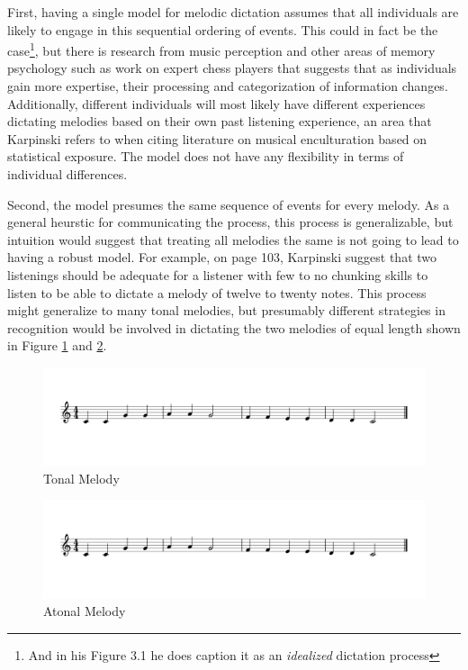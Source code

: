 \documentclass[]{book}
\let\rmarkdownfootnote\footnote%
\def\footnote{\protect\rmarkdownfootnote}
\begin{document}
First, having a single model for melodic dictation assumes that all individuals are likely to engage in this sequential ordering of events.
This could in fact be the case\footnote{And in his Figure 3.1 he does caption it as an \emph{idealized} dictation process}, but there is research from music perception \citep{goldmanImprovisationExperiencePredicts2018a} and other areas of memory psychology such as work on expert chess players \citep{laneChessKnowledgePredicts2018} that suggests that as individuals gain more expertise, their processing and categorization of information changes.
Additionally, different individuals will most likely have different experiences dictating melodies based on their own past listening experience, an area that Karpinski refers to when citing literature on musical enculturation based on statistical exposure.
The model does not have any flexibility in terms of individual differences.

Second, the model presumes the same sequence of events for every melody.
As a general heurstic for communicating the process, this process is generalizable, but intuition would suggest that treating all melodies the same is not going to lead to having a robust model.
For example, on page 103, Karpinski suggest that two listenings should be adequate for a listener with few to no chunking skills to listen to be able to dictate a melody of twelve to twenty notes.
This process might generalize to many tonal melodies, but presumably different strategies in recognition would be involved in dictating the two melodies of equal length shown in Figure \ref{fig:shortmelody1} and \ref{fig:shortmelody2}.

\begin{figure}

{\centering \includegraphics[width=0.8\linewidth]{img/musicalexamples/MMD_Figure2-1} 

}

\caption{Tonal Melody}\label{fig:shortmelody1}
\end{figure}

\begin{figure}

{\centering \includegraphics[width=0.8\linewidth]{img/musicalexamples/MMD_Figure2-1} 

}

\caption{Atonal Melody}\label{fig:shortmelody2}
\end{figure}
\end{document}
